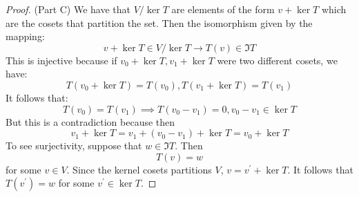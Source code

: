 \documentclass{article}
\begin{document}
\begin{proof}
        (Part C) We have that $V / \ker{T}$ are elements of the form $v + \ker{T}$ which are the cosets that partition the set. Then the isomorphism given by the mapping:
            \begin{equation*}
                v + \ker{T} \in V / \ker{T} \rightarrow T(v) \in \Im{T}
            \end{equation*}
        This is injective because if $v_{0} + \ker{T}, v_{1} + \ker{T}$ were two different cosets, we have:
            \begin{equation*}
                T(v_{0} + \ker{T}) = T(v_{0}), T(v_{1} + \ker{T}) = T(v_{1})
            \end{equation*}
        It follows that:
            \begin{equation*}
                T(v_{0}) = T(v_{1}) \implies T(v_{0} - v_{1}) = 0, v_{0} - v_{1} \in \ker{T}
            \end{equation*}
        But this is a contradiction because then
            \begin{equation*}
                v_{1} + \ker{T} = v_{1} + (v_{0} - v_{1}) + \ker{T} = v_{0} + \ker{T}
            \end{equation*}
        To see surjectivity, suppose that $w \in \Im{T}$. Then 
            \begin{equation*}
                T(v) = w
            \end{equation*}
        for some $v \in V$. Since the kernel cosets partitions $V$, $v = v^{\prime} + \ker{T}$. It follows that $T(v^{\prime}) = w$ for some $v^{\prime} \in \ker{T}$.
    \end{proof}
\end{document}

